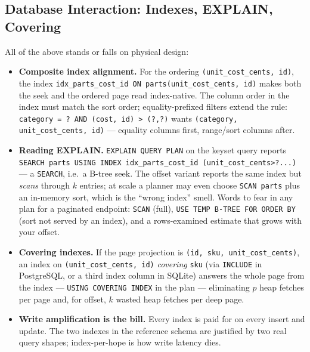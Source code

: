 \subsection{Database Interaction: Indexes, EXPLAIN, Covering}
\label{subsec:ch8-indexes}

All of the above stands or falls on physical design:

\begin{itemize}
  \item \textbf{Composite index alignment.} For the ordering
        \texttt{(unit\_cost\_cents, id)}, the index
        \texttt{idx\_parts\_cost\_id ON parts(unit\_cost\_cents, id)} makes
        both the seek and the ordered page read index-native. The column
        order in the index must match the sort order; equality-prefixed
        filters extend the rule: \texttt{category = ? AND (cost, id) > (?,?)}
        wants \texttt{(category, unit\_cost\_cents, id)} --- equality columns
        first, range/sort columns after.
  \item \textbf{Reading EXPLAIN.} \texttt{EXPLAIN QUERY PLAN} on the keyset
        query reports \texttt{SEARCH parts USING INDEX idx\_parts\_cost\_id
        (unit\_cost\_cents>?...)} --- a \texttt{SEARCH}, i.e.\ a B-tree seek.
        The offset variant reports the same index but \emph{scans} through
        $k$ entries; at scale a planner may even choose
        \texttt{SCAN parts} plus an in-memory sort, which is the
        ``wrong index'' smell. Words to fear in any plan for a paginated
        endpoint: \texttt{SCAN} (full), \texttt{USE TEMP B-TREE FOR ORDER
        BY} (sort not served by an index), and a rows-examined estimate that
        grows with your offset.
  \item \textbf{Covering indexes.} If the page projection is
        \texttt{(id, sku, unit\_cost\_cents)}, an index on
        \texttt{(unit\_cost\_cents, id)} \emph{covering} \texttt{sku} (via
        \texttt{INCLUDE} in PostgreSQL, or a third index column in SQLite)
        answers the whole page from the index --- \texttt{USING COVERING
        INDEX} in the plan --- eliminating $p$ heap fetches per page and,
        for offset, $k$ wasted heap fetches per deep page.
  \item \textbf{Write amplification is the bill.} Every index is paid for on
        every insert and update. The two indexes in the reference schema are
        justified by two real query shapes; index-per-hope is how write
        latency dies.
\end{itemize}

